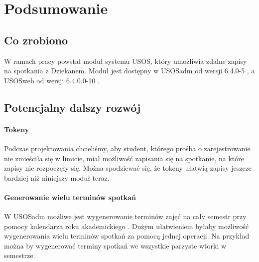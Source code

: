 \documentclass[licencjacka]{pracamgr}
\begin{document}



\chapter{Podsumowanie}  \label{chap:rozwoj}
\section{Co zrobiono}
W ramach pracy powstał moduł systemu USOS, który umożliwia zdalne zapisy na spotkania z Dziekanem. Moduł jest dostępny w USOSadm od wersji 6.4.0-5 \cite{dziennikadm}, a USOSweb od wersji 6.4.0.0-10 \cite{dziennikweb}.

\section{Potencjalny dalszy rozwój}

\subsubsection{Tokeny}
Podczas projektowania chcieliśmy, aby student, którego prośba o zarejestrowanie nie zmieściła się w limicie, miał możliwość zapisania się na spotkanie, na które zapisy nie rozpoczęły się. Można spodziewać się, że tokeny ułatwią zapisy jeszcze bardziej niż niniejszy moduł teraz.

\subsubsection{Generowanie wielu terminów spotkań}
W USOSadm możliwe jest wygenerowanie terminów zajęć na cały semestr przy pomocy kalendarza roku akademickiego \cite{kra}. Dużym ułatwieniem byłaby możliwość wygenerowania wielu terminów spotkań za pomocą jednej operacji. Na przykład można by wygenerować terminy spotkań we wszystkie parzyste wtorki w semestrze.
\end{document}
